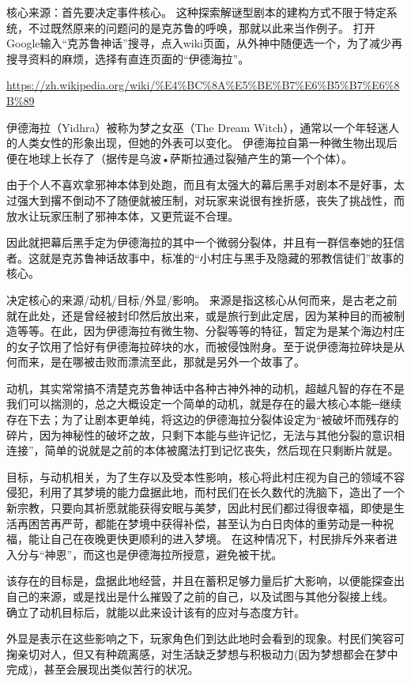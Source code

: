 \documentclass[a4paper,zihao=-4,notitlepage,twoside,openright]{ctexart}
\begin{document}
核心来源：首先要决定事件核心。
这种探索解谜型剧本的建构方式不限于特定系统，不过既然原来的问题问的是克苏鲁的呼唤，那就以此来当作例子。
打开Google输入“克苏鲁神话”搜寻，点入wiki页面，从外神中随便选一个，为了减少再搜寻资料的麻烦，选择有直连页面的“伊德海拉”。

\url{https://zh.wikipedia.org/wiki/%E4%BC%8A%E5%BE%B7%E6%B5%B7%E6%8B%89}

伊德海拉（Yidhra）被称为梦之女巫（The Dream Witch），通常以一个年轻迷人的人类女性的形象出现，但她的外表可以变化。
伊德海拉自第一种微生物出现后便在地球上长存了（据传是乌波•萨斯拉通过裂殖产生的第一个个体）。

由于个人不喜欢拿邪神本体到处跑，而且有太强大的幕后黑手对剧本不是好事，太过强大到撂不倒动不了随便就被压制，对玩家来说很有挫折感，丧失了挑战性，而放水让玩家压制了邪神本体，又更荒诞不合理。

因此就把幕后黑手定为伊德海拉的其中一个微弱分裂体，并且有一群信奉她的狂信者。这就是克苏鲁神话故事中，标准的“小村庄与黑手及隐藏的邪教信徒们”故事的核心。

决定核心的来源/动机/目标/外显/影响。
来源是指这核心从何而来，是古老之前就在此处，还是曾经被封印然后放出来，或是旅行到此定居，因为某种目的而被制造等等。在此，因为伊德海拉有微生物、分裂等等的特征，暂定为是某个海边村庄的女子饮用了恰好有伊德海拉碎块的水，而被侵蚀附身。至于说伊德海拉碎块是从何而来，是在哪被击败而漂流至此，那就是另外一个故事了。

动机，其实常常搞不清楚克苏鲁神话中各种古神外神的动机，超越凡智的存在不是我们可以揣测的，总之大概设定一个简单的动机，就是存在的最大核心本能─继续存在下去；为了让剧本更单纯，将这边的伊德海拉分裂体设定为“被破坏而残存的碎片，因为神秘性的破坏之故，只剩下本能与些许记忆，无法与其他分裂的意识相连接”，简单的说就是之前的本体被魔法打到记忆丧失，然后现在只剩断片就是。

目标，与动机相关，为了生存以及受本性影响，核心将此村庄视为自己的领域不容侵犯，利用了其梦境的能力盘据此地，而村民们在长久数代的洗脑下，造出了一个新宗教，只要向其祈愿就能获得安眠与美梦，因此村民们都过得很幸福，即使是生活再困苦再严苛，都能在梦境中获得补偿，甚至认为白日肉体的重劳动是一种祝福，能让自己在夜晚更快更顺利的进入梦境。
在这种情况下，村民排斥外来者进入分与“神恩”，而这也是伊德海拉所授意，避免被干扰。

该存在的目标是，盘据此地经营，并且在蓄积足够力量后扩大影响，以便能探查出自己的来源，或是找出是什么摧毁了之前的自己，以及试图与其他分裂接上线。
确立了动机目标后，就能以此来设计该有的应对与态度方针。

外显是表示在这些影响之下，玩家角色们到达此地时会看到的现象。村民们笑容可掬亲切对人，但又有种疏离感，对生活缺乏梦想与积极动力(因为梦想都会在梦中完成)，甚至会展现出类似苦行的状况。
\end{document}

